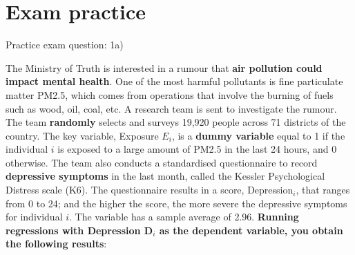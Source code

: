 \documentclass[11pt]{beamer}
\begin{document}
\section{Exam practice}


\begin{frame}{Practice exam question: 1a)}

   \small{The Ministry of Truth is interested in a rumour that \textbf{air pollution could impact mental health}. One of the most harmful pollutants is fine particulate matter PM2.5, which comes from operations that involve the burning of fuels such as wood, oil, coal, etc. A research team is sent to investigate the rumour. The team \textbf{randomly} selects and surveys 19,920 people across 71 districts of the country. The key variable, Exposure $E_i$, is a \textbf{dummy variable} equal to 1 if the individual $i$ is exposed to a large amount of PM2.5 in the last 24 hours, and 0 otherwise. The team also conducts a standardised questionnaire to record \textbf{depressive symptoms} in the last month, called the Kessler Psychological Distress scale (K6). The questionnaire results in a score, Depression$_i$, that ranges from 0 to 24; and the higher the score, the more severe the depressive symptoms for individual $i$. The variable has a sample average of 2.96. \textbf{Running regressions with Depression D$_i$ as  the dependent variable, you obtain the following results}:
}
    
\end{frame}
\end{document}
